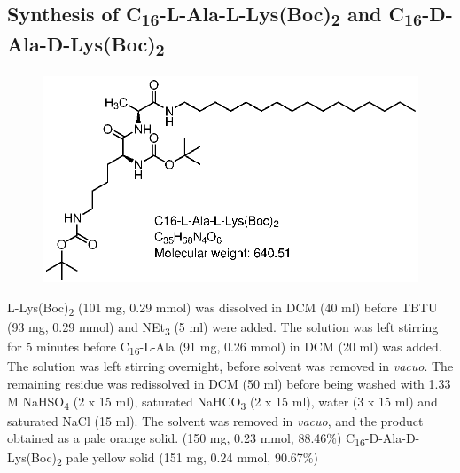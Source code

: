\subsection*{Synthesis of C\textsubscript{16}-L-Ala-L-Lys(Boc)\textsubscript{2} and C\textsubscript{16}-D-Ala-D-Lys(Boc)\textsubscript{2}}
\begin{figure}[h!]
\centering
\includegraphics{Figures/C16-L-Ala-L-Lys_boc_2.eps}
\end{figure}
L-Lys(Boc)\textsubscript{2} (101 mg, 0.29 mmol) was dissolved in DCM (40 ml) before TBTU (93 mg, 0.29 mmol) and NEt\textsubscript{3} (5 ml) were added. The solution was left stirring for 5 minutes before C\textsubscript{16}-L-Ala (91 mg, 0.26 mmol) in DCM (20 ml) was added. The solution was left stirring overnight, before solvent was removed in \textit{vacuo}.
\newline
The remaining residue was redissolved in DCM (50 ml) before being washed with 1.33 M NaHSO\textsubscript{4} (2 x 15 ml), saturated NaHCO\textsubscript{3} (2 x 15 ml), water (3 x 15 ml) and saturated NaCl (15 ml). The solvent was removed in \textit{vacuo}, and the product obtained as a pale orange solid. (150 mg, 0.23 mmol, 88.46\%) C\textsubscript{16}-D-Ala-D-Lys(Boc)\textsubscript{2} pale yellow solid (151 mg, 0.24 mmol, 90.67\%)

